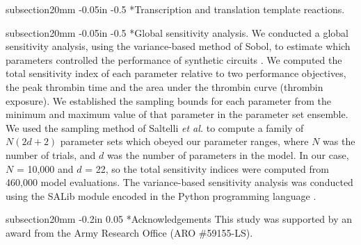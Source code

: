 \documentclass[12pt]{article}
\makeatletter
\renewcommand\subsection{\@startsection
	{subsection}{2}{0mm}
	{-0.05in}
	{-0.5\baselineskip}
	{\normalfont\normalsize\bfseries}}
\renewcommand\section{\@startsection
	{subsection}{2}{0mm}
	{-0.2in}
	{0.05\baselineskip}
	{\normalfont\large\bfseries}}
\makeatother
\begin{document}
\subsection*{Transcription and translation template reactions.}

\subsection*{Global sensitivity analysis.}
We conducted a global sensitivity analysis, using the variance-based method of Sobol, to estimate which parameters controlled the performance of synthetic circuits \citep{SOBOL_METHOD}.
We computed the total sensitivity index of each parameter relative to two performance objectives, the peak thrombin time and the area under the thrombin curve (thrombin exposure).
We established the sampling bounds for each parameter from the minimum and maximum value of that parameter in the parameter set ensemble.
We used the sampling method of Saltelli \textit{et al.} \citep{Saltelli:2010} to compute a family of $N\left(2d+2\right)$ parameter sets which obeyed our parameter ranges,
where $N$ was the number of trials, and $d$ was the number of parameters in the model. In our case, $N$ = 10,000 and $d$ = 22, so the total sensitivity indices were computed from
460,000 model evaluations. The variance-based sensitivity analysis was conducted using the SALib module encoded in the Python programming language \citep{SALIB}.

\clearpage

\section*{Acknowledgements}
This study was supported by an award from the Army Research Office (ARO \#59155-LS).
\clearpage



\clearpage

\renewcommand\thefigure{S\arabic{figure}}
\renewcommand\thetable{T\arabic{table}}
\renewcommand\thepage{S-\arabic{page}}
\renewcommand\theequation{S\arabic{equation}}

\setcounter{equation}{0}
\setcounter{table}{0}
\setcounter{figure}{0}
\setcounter{page}{1}
\end{document}
